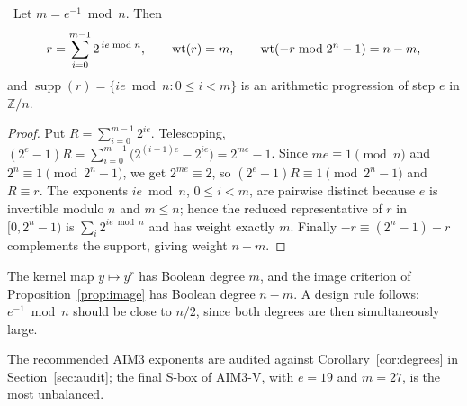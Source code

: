 \begin{proposition}\label{prop:weight}
\Proved\ Let $m=e^{-1}\bmod n$. Then
\[
  r=\sum_{i=0}^{m-1}2^{\,ie \bmod n},\qquad \operatorname{wt}(r)=m,\qquad \operatorname{wt}(-r\bmod 2^n-1)=n-m ,
\]
and $\operatorname{supp}(r)=\{ie\bmod n: 0\le i<m\}$ is an arithmetic progression of step $e$ in
$\mathbb{Z}/n$.
\end{proposition}
\begin{proof}
Put $R=\sum_{i=0}^{m-1}2^{ie}$. Telescoping,
$(2^e-1)R=\sum_{i=0}^{m-1}\bigl(2^{(i+1)e}-2^{ie}\bigr)=2^{me}-1$. Since $me\equiv1\pmod n$ and
$2^n\equiv1 \pmod{2^n-1}$, we get $2^{me}\equiv 2$, so $(2^e-1)R\equiv1\pmod{2^n-1}$ and $R\equiv r$.
The exponents $ie\bmod n$, $0\le i<m$, are pairwise distinct because $e$ is invertible modulo $n$ and
$m\le n$; hence the reduced representative of $r$ in $[0,2^n-1)$ is $\sum_i 2^{ie\bmod n}$ and has
weight exactly $m$. Finally $-r\equiv (2^n-1)-r$ complements the support, giving weight $n-m$.
\end{proof}

\begin{corollary}\label{cor:degrees}
The kernel map $y\mapsto y^{r}$ has Boolean degree $m$, and the image criterion of
Proposition~\ref{prop:image} has Boolean degree $n-m$. A design rule follows: $e^{-1}\bmod n$ should
be close to $n/2$, since both degrees are then simultaneously large.
\end{corollary}

The recommended AIM3 exponents are audited against Corollary~\ref{cor:degrees} in
Section~\ref{sec:audit}; the final S-box of AIM3-V, with $e=19$ and $m=27$, is the most unbalanced.
